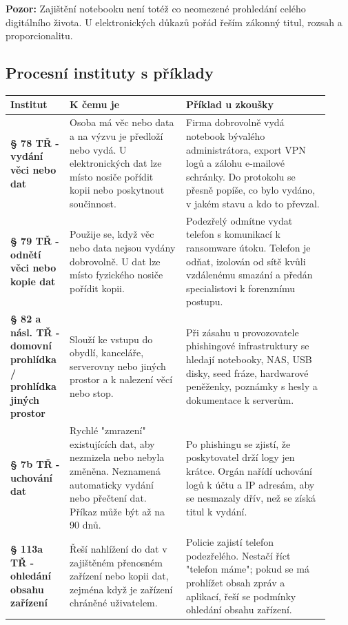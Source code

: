\documentclass[11pt,a4paper]{article}
\newcommand{\pozor}[1]{\begin{tcolorbox}[breakable,enhanced,colback=red!7,colframe=red!30!black,boxrule=0pt,arc=1mm,left=5pt,right=5pt,top=5pt,bottom=5pt,before skip=6pt,after skip=6pt]\textbf{Pozor:} #1\end{tcolorbox}}
\begin{document}
\pozor{Zajištění notebooku není totéž co neomezené prohledání celého digitálního života. U elektronických důkazů pořád řeším zákonný titul, rozsah a proporcionalitu.}

\subsection*{Procesní instituty s příklady}
\begin{longtable}{p{0.16\linewidth}p{0.34\linewidth}p{0.42\linewidth}}
\toprule
\textbf{Institut} & \textbf{K čemu je} & \textbf{Příklad u zkoušky}\\
\midrule
\textbf{§ 78 TŘ - vydání věci nebo dat} & Osoba má věc nebo data a na výzvu je předloží nebo vydá. U elektronických dat lze místo nosiče pořídit kopii nebo poskytnout součinnost. & Firma dobrovolně vydá notebook bývalého administrátora, export VPN logů a zálohu e-mailové schránky. Do protokolu se přesně popíše, co bylo vydáno, v jakém stavu a kdo to převzal.\\
\addlinespace
\textbf{§ 79 TŘ - odnětí věci nebo kopie dat} & Použije se, když věc nebo data nejsou vydány dobrovolně. U dat lze místo fyzického nosiče pořídit kopii. & Podezřelý odmítne vydat telefon s komunikací k ransomware útoku. Telefon je odňat, izolován od sítě kvůli vzdálenému smazání a předán specialistovi k forenznímu postupu.\\
\addlinespace
\textbf{§ 82 a násl. TŘ - domovní prohlídka / prohlídka jiných prostor} & Slouží ke vstupu do obydlí, kanceláře, serverovny nebo jiných prostor a k nalezení věcí nebo stop. & Při zásahu u provozovatele phishingové infrastruktury se hledají notebooky, NAS, USB disky, seed fráze, hardwarové peněženky, poznámky s hesly a dokumentace k serverům.\\
\addlinespace
\textbf{§ 7b TŘ - uchování dat} & Rychlé "zmrazení" existujících dat, aby nezmizela nebo nebyla změněna. Neznamená automaticky vydání nebo přečtení dat. Příkaz může být až na 90 dnů. & Po phishingu se zjistí, že poskytovatel drží logy jen krátce. Orgán nařídí uchování logů k účtu a IP adresám, aby se nesmazaly dřív, než se získá titul k vydání.\\
\addlinespace
\textbf{§ 113a TŘ - ohledání obsahu zařízení} & Řeší nahlížení do dat v zajištěném přenosném zařízení nebo kopii dat, zejména když je zařízení chráněné uživatelem. & Policie zajistí telefon podezřelého. Nestačí říct "telefon máme"; pokud se má prohlížet obsah zpráv a aplikací, řeší se podmínky ohledání obsahu zařízení.\\

\end{longtable}
\end{document}
